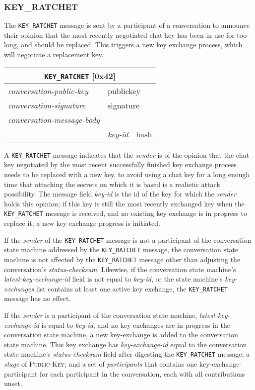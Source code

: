 \documentclass{article}
\def\npmessage#1{\texttt{#1}}
\def\field#1{\textit{#1}}
\def\smfield#1{\textsl{#1}}
\def\type#1{\textsf{#1}}
\newenvironment{conversationmessage}[2]{
\newcommand{\messagefield}[2]{
& \field{##1} & \type{##2} \\
\hline
}
\hspace{2em minus 2em}\begin{tabular}{|l|l|l|}
\hline
\multicolumn{3}{|c|}{\npmessage{#1} [#2]} \\
\hline
\hline
\field{conversation-public-key} & \multicolumn{2}{l|}{\type{publickey}} \\
\hline
\field{conversation-signature} & \multicolumn{2}{l|}{\type{signature}} \\
\hline
\field{conversation-message-body} & \multicolumn{2}{l|}{} \\
\hline
}{
\end{tabular}
}
\begin{document}
\subsubsection{KEY\_RATCHET}
\label{sec:messages/key-ratchet}

The \npmessage{KEY\_RATCHET} message is sent by a participant of a conversation to announce their opinion that the most recently negotiated chat key has been in use for too long, and should be replaced.
This triggers a new key exchange process, which will negotiate a replacement key.

\begin{conversationmessage}{KEY\_RATCHET}{0x42}
\messagefield{key-id}{hash}
\end{conversationmessage}

A \npmessage{KEY\_RATCHET} message indicates that the \field{sender} is of the opinion that the chat key negotiated by the most recent successfully finished key exchange process needs to be replaced with a new key, to avoid using a chat key for a long enough time that attacking the secrets on which it is based is a realistic attack possibility.
The message field \field{key-id} is the id of the key for which the \field{sender} holds this opinion; if this key is still the most recently exchanged key when the \npmessage{KEY\_RATCHET} message is received, and no existing key exchange is in progress to replace it, a new key exchange progress is initiated.

If the \field{sender} of the \npmessage{KEY\_RATCHET} message is not a participant of the conversation state machine addressed by the \npmessage{KEY\_RATCHET} message, the conversation state machine is not affected by the \npmessage{KEY\_RATCHET} message other than adjusting the conversation's \smfield{status-checksum}.
Likewise, if the conversation state machine's \smfield{latest-key-exchange-id} field is not equal to \field{key-id}, or the state machine's \smfield{key-exchanges} list contains at least one active key exchange, the \npmessage{KEY\_RATCHET} message has no effect.

If the \field{sender} is a participant of the conversation state machine, \smfield{latest-key-exchange-id} is equal to \field{key-id}, and no key exchanges are in progress in the conversation state machine, a new \type{key-exchange} is added to the conversation state machine.
This key exchange has \smfield{key-exchange-id} equal to the conversation state machine's \smfield{status-checksum} field after digesting the \npmessage{KEY\_RATCHET} message; a \smfield{stage} of \textsc{Public-Key}; and a set of \smfield{participants} that contains one \type{key-exchange-participant} for each participant in the conversation, each with all contributions unset.
\end{document}
